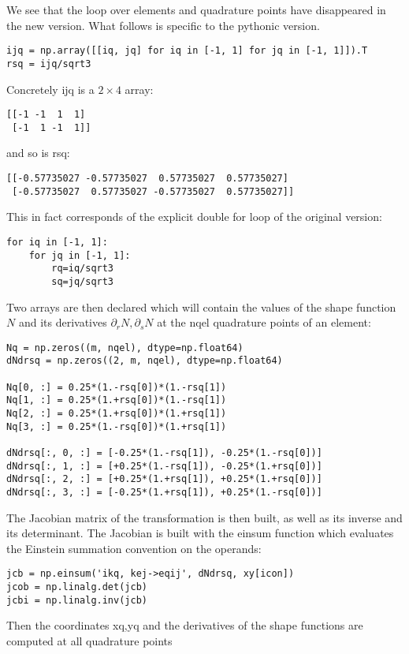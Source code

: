 We see that the loop over elements and quadrature points have disappeared in the new version. 
What follows is specific to the pythonic version. 

\begin{lstlisting}
ijq = np.array([[iq, jq] for iq in [-1, 1] for jq in [-1, 1]]).T
rsq = ijq/sqrt3
\end{lstlisting}
Concretely ijq is a $2\times 4$ array:
\begin{verbatim}
[[-1 -1  1  1]
 [-1  1 -1  1]]
\end{verbatim}
and so is rsq:
\begin{verbatim}
[[-0.57735027 -0.57735027  0.57735027  0.57735027]
 [-0.57735027  0.57735027 -0.57735027  0.57735027]]
\end{verbatim}
This in fact corresponds of the explicit double for loop of the original version:
\begin{lstlisting}
for iq in [-1, 1]:
    for jq in [-1, 1]:
        rq=iq/sqrt3
        sq=jq/sqrt3
\end{lstlisting}


Two arrays are then declared which will contain the values of the shape function $N$
and its derivatives $\partial_r N,\partial_s N$ at the nqel quadrature points of an element:
\begin{lstlisting}
Nq = np.zeros((m, nqel), dtype=np.float64)        
dNdrsq = np.zeros((2, m, nqel), dtype=np.float64)

Nq[0, :] = 0.25*(1.-rsq[0])*(1.-rsq[1])
Nq[1, :] = 0.25*(1.+rsq[0])*(1.-rsq[1])
Nq[2, :] = 0.25*(1.+rsq[0])*(1.+rsq[1])
Nq[3, :] = 0.25*(1.-rsq[0])*(1.+rsq[1])

dNdrsq[:, 0, :] = [-0.25*(1.-rsq[1]), -0.25*(1.-rsq[0])]
dNdrsq[:, 1, :] = [+0.25*(1.-rsq[1]), -0.25*(1.+rsq[0])]
dNdrsq[:, 2, :] = [+0.25*(1.+rsq[1]), +0.25*(1.+rsq[0])]
dNdrsq[:, 3, :] = [-0.25*(1.+rsq[1]), +0.25*(1.-rsq[0])]
\end{lstlisting}


The Jacobian matrix of the transformation is then built,
as well as its inverse and its determinant. 
The Jacobian is built with the einsum function which
evaluates the Einstein summation convention on the operands:
\begin{lstlisting}
jcb = np.einsum('ikq, kej->eqij', dNdrsq, xy[icon])
jcob = np.linalg.det(jcb)
jcbi = np.linalg.inv(jcb)
\end{lstlisting}


Then the coordinates xq,yq and the derivatives of the shape functions 
are computed at all quadrature points 

